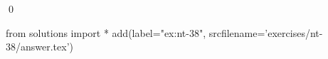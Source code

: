 
\begin{ex} 
  \label{ex:nt-38}
  
  \qed
\end{ex} 
\begin{python0}
from solutions import *
add(label="ex:nt-38",
    srcfilename='exercises/nt-38/answer.tex') 
\end{python0}

